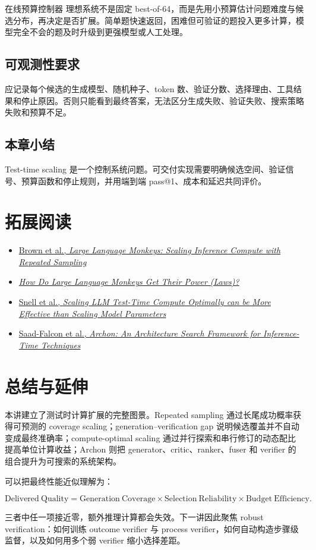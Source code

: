 \documentclass[a4paper]{article}
\begin{document}
\begin{importantbox}{在线预算控制器}
理想系统不是固定 best-of-64，而是先用小预算估计问题难度与候选分布，再决定是否扩展。简单题快速返回，困难但可验证的题投入更多计算，模型完全不会的题及时升级到更强模型或人工处理。
\end{importantbox}

\subsection{可观测性要求}

应记录每个候选的生成模型、随机种子、token 数、验证分数、选择理由、工具结果和停止原因。否则只能看到最终答案，无法区分生成失败、验证失败、搜索策略失败和预算不足。

\subsection{本章小结}

Test-time scaling 是一个控制系统问题。可交付实现需要明确候选空间、验证信号、预算函数和停止规则，并用端到端 pass@1、成本和延迟共同评价。

\section{拓展阅读}

\begin{itemize}
    \item \href{https://arxiv.org/abs/2407.21787}{Brown et al., \emph{Large Language Monkeys: Scaling Inference Compute with Repeated Sampling}}
    \item \href{https://arxiv.org/abs/2502.17578}{\emph{How Do Large Language Monkeys Get Their Power (Laws)?}}
    \item \href{https://arxiv.org/abs/2408.03314}{Snell et al., \emph{Scaling LLM Test-Time Compute Optimally can be More Effective than Scaling Model Parameters}}
    \item \href{https://arxiv.org/abs/2409.15254}{Saad-Falcon et al., \emph{Archon: An Architecture Search Framework for Inference-Time Techniques}}
\end{itemize}

\section{总结与延伸}

本讲建立了测试时计算扩展的完整图景。Repeated sampling 通过长尾成功概率获得可预测的 coverage scaling；generation--verification gap 说明候选覆盖并不自动变成最终准确率；compute-optimal scaling 通过并行探索和串行修订的动态配比提高单位计算收益；Archon 则把 generator、critic、ranker、fuser 和 verifier 的组合提升为可搜索的系统架构。

可以把最终性能近似理解为：

$$
\mathrm{Delivered\ Quality}
=\mathrm{Generation\ Coverage}
\times\mathrm{Selection\ Reliability}
\times\mathrm{Budget\ Efficiency}.
$$

三者中任一项接近零，额外推理计算都会失效。下一讲因此聚焦 robust verification：如何训练 outcome verifier 与 process verifier，如何自动构造步骤级监督，以及如何用多个弱 verifier 缩小选择差距。
\end{document}
